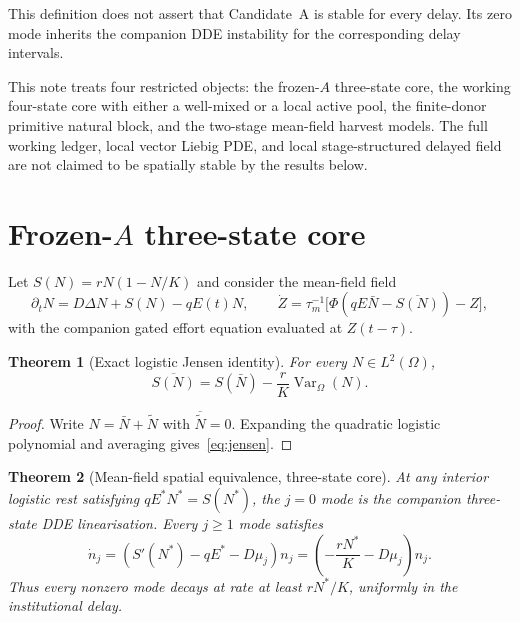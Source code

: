 \documentclass[11pt]{article}
\newtheorem{theorem}{Theorem}
\theoremstyle{definition}
\begin{document}
This definition does not assert that Candidate~A is stable for every delay. Its zero mode inherits the companion DDE instability for the corresponding delay intervals.

This note treats four restricted objects: the frozen-$A$ three-state core, the working four-state core with either a well-mixed or a local active pool, the finite-donor primitive natural block, and the two-stage mean-field harvest models. The full working ledger, local vector Liebig PDE, and local stage-structured delayed field are not claimed to be spatially stable by the results below.

\section{Frozen-$A$ three-state core}
\label{sec:three}

Let $S(N)=rN(1-N/K)$ and consider the mean-field field
\begin{equation}
\partial_tN=D\Delta N+S(N)-qE(t)N,
\qquad
\dot Z=\tau_m^{-1}\bigl[\Phi(qE\bar N-\overline{S(N)})-Z\bigr],
\label{eq:mf3}
\end{equation}
with the companion gated effort equation evaluated at $Z(t-\tau)$.

\begin{theorem}[Exact logistic Jensen identity]
\label{thm:jensen}
For every $N\in L^2(\Omega)$,
\begin{equation}
\overline{S(N)}=S(\bar N)-\frac rK\operatorname{Var}_\Omega(N).
\label{eq:jensen}
\end{equation}
\end{theorem}

\begin{proof}
Write $N=\bar N+\widetilde N$ with $\overline{\widetilde N}=0$. Expanding the quadratic logistic polynomial and averaging gives~\eqref{eq:jensen}.\end{proof}

\begin{theorem}[Mean-field spatial equivalence, three-state core]
\label{thm:mf3}
At any interior logistic rest satisfying $qE^*N^*=S(N^*)$, the $j=0$ mode is the companion three-state DDE linearisation. Every $j\ge1$ mode satisfies
\begin{equation}
\dot n_j=\left(S'(N^*)-qE^*-D\mu_j\right)n_j
=\left(-\frac{rN^*}{K}-D\mu_j\right)n_j.
\label{eq:n3}
\end{equation}
Thus every nonzero mode decays at rate at least $rN^*/K$, uniformly in the institutional delay.
\end{theorem}
\end{document}
